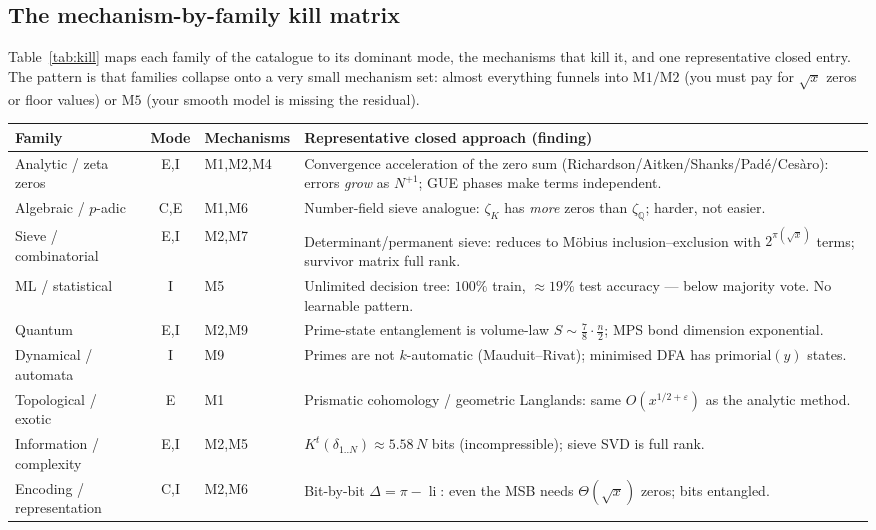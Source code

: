 \documentclass[11pt]{article}
\theoremstyle{plain}
\theoremstyle{definition}
\theoremstyle{remark}
\DeclareMathOperator{\li}{li}
\newcommand{\eps}{\varepsilon}
\begin{document}
\subsection{The mechanism-by-family kill matrix}

Table~\ref{tab:kill} maps each family of the catalogue to its dominant mode, the
mechanisms that kill it, and one representative closed entry. The pattern is that
families collapse onto a very small mechanism set: almost everything funnels into
$\mathrm{M1}/\mathrm{M2}$ (you must pay for $\sqrt{x}$ zeros or floor values) or
$\mathrm{M5}$ (your smooth model is missing the residual).

\begin{table}[t]
\centering
\footnotesize
\renewcommand{\arraystretch}{1.25}
\begin{tabular}{@{}p{2.55cm} c p{2.05cm} p{7.4cm}@{}}
\toprule
\textbf{Family} & \textbf{Mode} & \textbf{Mechanisms} & \textbf{Representative closed approach (finding)}\\
\midrule
Analytic / zeta zeros & E,I & M1,M2,M4 & Convergence acceleration of the zero sum (Richardson/Aitken/Shanks/Pad\'e/Ces\`aro): errors \emph{grow} as $N^{+1}$; GUE phases make terms independent. \\
Algebraic / $p$-adic & C,E & M1,M6 & Number-field sieve analogue: $\zeta_K$ has \emph{more} zeros than $\zeta_{\mathbb{Q}}$; harder, not easier. \\
Sieve / combinatorial & E,I & M2,M7 & Determinant/permanent sieve: reduces to M\"obius inclusion--exclusion with $2^{\pi(\sqrt{x})}$ terms; survivor matrix full rank. \\
ML / statistical & I & M5 & Unlimited decision tree: $100\%$ train, ${\approx}19\%$ test accuracy --- below majority vote. No learnable pattern. \\
Quantum & E,I & M2,M9 & Prime-state entanglement is volume-law $S\sim\tfrac{7}{8}\cdot\tfrac{n}{2}$; MPS bond dimension exponential. \\
Dynamical / automata & I & M9 & Primes are not $k$-automatic (Mauduit--Rivat); minimised DFA has $\mathrm{primorial}(y)$ states. \\
Topological / exotic & E & M1 & Prismatic cohomology / geometric Langlands: same $O(x^{1/2+\eps})$ as the analytic method. \\
Information / complexity & E,I & M2,M5 & $K^t(\delta_{1..N})\approx 5.58\,N$ bits (incompressible); sieve SVD is full rank. \\
Encoding / representation & C,I & M2,M6 & Bit-by-bit $\Delta=\pi-\li$: even the MSB needs $\Theta(\sqrt{x})$ zeros; bits entangled. \\

\end{tabular}
\end{table}
\end{document}
